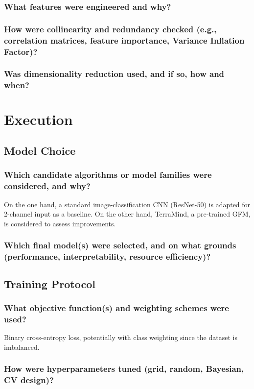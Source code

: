 \documentclass[sigconf]{acmart}
\begin{document}
\subsubsection{What features were engineered and why?}
\subsubsection{How were collinearity and redundancy checked (e.g., correlation matrices, feature importance, Variance Inflation Factor)?}
\subsubsection{Was dimensionality reduction used, and if so, how and when?}

\section{Execution}

\subsection{Model Choice}
\subsubsection{Which candidate algorithms or model families were considered, and why?} On the one hand, a standard image-classification CNN (ResNet-50) is adapted for 2-channel input as a baseline. On the other hand, TerraMind, a pre-trained GFM, is considered to assess improvements.
\subsubsection{Which final model(s) were selected, and on what grounds (performance, interpretability, resource efficiency)?}

\subsection{Training Protocol}
\subsubsection{What objective function(s) and weighting schemes were used?} Binary cross-entropy loss, potentially with class weighting since the dataset is imbalanced.
\subsubsection{How were hyperparameters tuned (grid, random, Bayesian, CV design)?}
\end{document}
